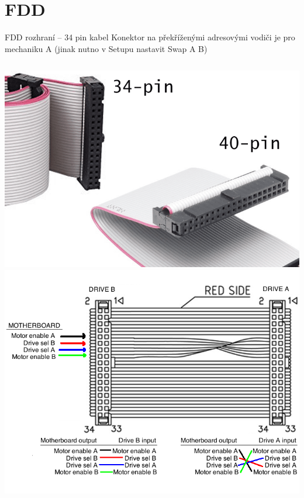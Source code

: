 \documentclass[aspectratio=43]{beamer}
\begin{document}
\section{FDD}
\begin{frame}{FDD rozhraní – 34 pin kabel}
	Konektor na překříženými adresovými vodiči je pro mechaniku A (jinak nutno v Setupu nastavit Swap A B)
	\begin{columns}
		\includegraphics[width=1\linewidth]{extrahovane_obrazky/ide.png}
		\includegraphics[width=1\linewidth]{extrahovane_obrazky/fdd_flip.png}
	\end{columns}
	
\end{frame}
\end{document}
